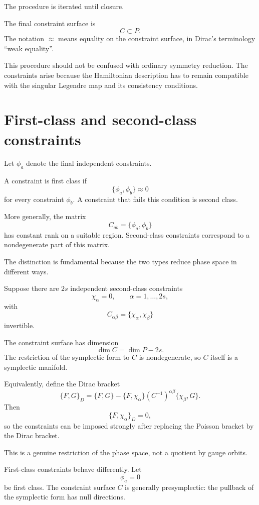 The procedure is iterated until closure.

The final constraint surface is
\[
        C\subset P.
\]
The notation $\approx$ means equality on the constraint surface, in Dirac's
terminology ``weak equality''.

This procedure should not be confused with ordinary symmetry reduction.
The constraints arise because the Hamiltonian description has to remain
compatible with the singular Legendre map and its consistency conditions.

\section{First-class and second-class constraints}

Let $\phi_a$ denote the final independent constraints.

A constraint is first class if
\[
        \{\phi_a,\phi_b\}\approx0
\]
for every constraint $\phi_b$.  A constraint that fails this condition is
second class.

More generally, the matrix
\[
        C_{ab}=\{\phi_a,\phi_b\}
\]
has constant rank on a suitable region.  Second-class constraints correspond
to a nondegenerate part of this matrix.

The distinction is fundamental because the two types reduce phase space in
different ways.

Suppose there are $2s$ independent second-class constraints
\[
        \chi_\alpha=0,
        \qquad
        \alpha=1,\ldots,2s,
\]
with
\[
        C_{\alpha\beta}
        =
        \{\chi_\alpha,\chi_\beta\}
\]
invertible.

The constraint surface has dimension
\[
        \dim C=\dim P-2s.
\]
The restriction of the symplectic form to $C$ is nondegenerate, so $C$ itself
is a symplectic manifold.

Equivalently, define the Dirac bracket
\[
\{F,G\}_D
=
\{F,G\}
-
\{F,\chi_\alpha\}
(C^{-1})^{\alpha\beta}
\{\chi_\beta,G\}.
\]
Then
\[
        \{F,\chi_\alpha\}_D=0,
\]
so the constraints can be imposed strongly after replacing the Poisson
bracket by the Dirac bracket.

This is a genuine restriction of the phase space, not a quotient by gauge
orbits.

First-class constraints behave differently.  Let
\[
        \phi_a=0
\]
be first class.  The constraint surface $C$ is generally presymplectic:
the pullback of the symplectic form has null directions.


